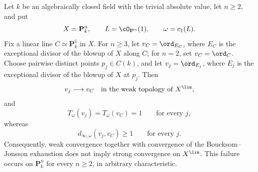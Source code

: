 \begin{theorem}
\label{thm:ch49-global-radon-riesz-counterexample}
Let $k$ be an algebraically closed field with the trivial absolute value,
let $n\ge2$, and put
\[
             X=\mathbf P^n_k,
             \qquad L=\cO_{\mathbf P^n}(1),
             \qquad \omega=c_1(L).
\]
Fix a linear line $C\simeq\mathbf P^1_k$ in $X$.  For $n\ge3$,
let $v_C=\ord_{E_C}$, where $E_C$ is the exceptional divisor of the
blowup of $X$ along $C$; for $n=2$, set $v_C=\ord_C$.  Choose
pairwise distinct points $p_j\in C(k)$, and let $v_j=\ord_{E_j}$, where
$E_j$ is the exceptional divisor of the blowup of $X$ at $p_j$.  Then
\[
              v_j\longrightarrow v_C
              \quad\text{in the weak topology of }X^{\lin},
\]
and
\[
              T_\omega(v_j)=T_\omega(v_C)=1
              \qquad\text{for every }j,
\]
whereas
\[
              d_{\infty,\omega}(v_j,v_C)\ge1
              \qquad\text{for every }j.
\]
Consequently, weak convergence together with convergence of the
Boucksom--Jonsson exhaustion does not imply strong convergence on
$X^{\lin}$.  This failure occurs on $\mathbf P^n_k$ for every
$n\ge2$, in arbitrary characteristic.
\end{theorem}

